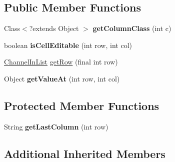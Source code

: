 \subsection*{Public Member Functions}
\begin{DoxyCompactItemize}
\item 
\hypertarget{classgov_1_1fnal_1_1ppd_1_1dd_1_1channel_1_1list_1_1table_1_1ImageChooserTableModel_a8b7164eb617a21eb497f184c3acd1950}{Class$<$?extends Object $>$ {\bfseries get\-Column\-Class} (int c)}\label{classgov_1_1fnal_1_1ppd_1_1dd_1_1channel_1_1list_1_1table_1_1ImageChooserTableModel_a8b7164eb617a21eb497f184c3acd1950}

\item 
\hypertarget{classgov_1_1fnal_1_1ppd_1_1dd_1_1channel_1_1list_1_1table_1_1ImageChooserTableModel_ac9c6c92a598cb666edd2e6bc572a0c72}{boolean {\bfseries is\-Cell\-Editable} (int row, int col)}\label{classgov_1_1fnal_1_1ppd_1_1dd_1_1channel_1_1list_1_1table_1_1ImageChooserTableModel_ac9c6c92a598cb666edd2e6bc572a0c72}

\item 
\hyperlink{interfacegov_1_1fnal_1_1ppd_1_1dd_1_1channel_1_1ChannelInList}{Channel\-In\-List} \hyperlink{classgov_1_1fnal_1_1ppd_1_1dd_1_1channel_1_1list_1_1table_1_1ImageChooserTableModel_a00da5535ef51a9e172a596176dfbc48e}{get\-Row} (final int row)
\item 
\hypertarget{classgov_1_1fnal_1_1ppd_1_1dd_1_1channel_1_1list_1_1table_1_1ImageChooserTableModel_a4cc66bad16ee719c0162a2497820b0ab}{Object {\bfseries get\-Value\-At} (int row, int col)}\label{classgov_1_1fnal_1_1ppd_1_1dd_1_1channel_1_1list_1_1table_1_1ImageChooserTableModel_a4cc66bad16ee719c0162a2497820b0ab}

\end{DoxyCompactItemize}
\subsection*{Protected Member Functions}
\begin{DoxyCompactItemize}
\item 
\hypertarget{classgov_1_1fnal_1_1ppd_1_1dd_1_1channel_1_1list_1_1table_1_1ImageChooserTableModel_a066069011216ddcd14e75b5fef2065b7}{String {\bfseries get\-Last\-Column} (int row)}\label{classgov_1_1fnal_1_1ppd_1_1dd_1_1channel_1_1list_1_1table_1_1ImageChooserTableModel_a066069011216ddcd14e75b5fef2065b7}

\end{DoxyCompactItemize}
\subsection*{Additional Inherited Members}


